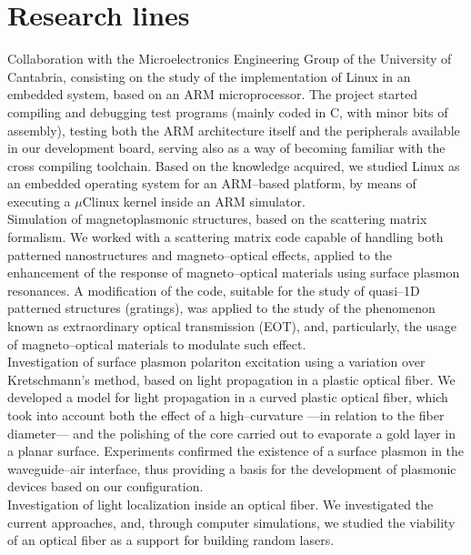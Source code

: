 \documentclass[11pt, a4paper]{article}
\newcommand{\years}[1]{\marginnote{\scriptsize #1}}
\begin{document}
\section*{Research lines} %
\noindent
\years{2005--2008}Collaboration with the Microelectronics Engineering Group of the University of Cantabria, consisting on the study of the implementation of Linux in an embedded system, based on an ARM microprocessor. The project started compiling and debugging test programs (mainly coded in C, with minor bits of assembly), testing both the ARM architecture itself and the peripherals available in our development board, serving also as a way of becoming familiar with the cross compiling toolchain. Based on the knowledge acquired, we studied Linux as an embedded operating system for an ARM--based platform, by means of executing a $\mu$Clinux kernel inside an ARM simulator.\\
\years{2008--2009}Simulation of magnetoplasmonic structures, based on the scattering matrix formalism. We worked with a scattering matrix code capable of handling both patterned nanostructures and magneto--optical effects, applied to the enhancement of the response of magneto--optical materials using surface plasmon resonances. A modification of the code, suitable for the study of quasi--1D patterned structures (gratings), was applied to the study of the phenomenon known as extraordinary optical transmission (EOT), and, particularly, the usage of magneto--optical materials to modulate such effect.\\
\years{2009--2011}Investigation of surface plasmon polariton excitation using a variation over Kretschmann's method, based on light propagation in a plastic optical fiber. We developed a model for light propagation in a curved plastic optical fiber, which took into account both the effect of a high--curvature ---in relation to the fiber diameter--- and the polishing of the core carried out to evaporate a gold layer in a planar surface. Experiments confirmed the existence of a surface plasmon in the waveguide--air interface, thus providing a basis for the development of plasmonic devices based on our configuration.\\
\years{2010}Investigation of light localization inside an optical fiber. We investigated the current approaches, and, through computer simulations, we studied the viability of an optical fiber as a support for building random lasers.\\
\end{document}
